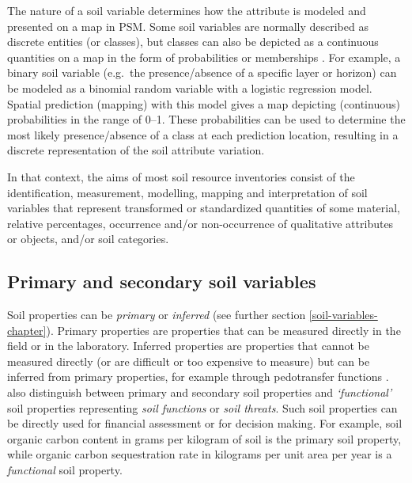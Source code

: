 \documentclass[graybox,natbib,nospthms,UStrade]{svmono}
\begin{document}
The nature of a soil variable determines how the attribute is modeled
and presented on a map in PSM. Some soil variables are
normally described as discrete entities (or classes), but classes can also be
depicted as a continuous quantities on a map in the form of
probabilities or memberships
\citep{DeGruijter1997Geoderma, McBratney2003Geoderma, Kempen2009Geoderma, Odgers201130}.
For example, a binary soil variable (e.g.~the presence/absence of a
specific layer or horizon) can be modeled as a binomial random variable
with a logistic regression model. Spatial prediction (mapping) with this
model gives a map depicting (continuous) probabilities in the range of
0--1. These probabilities can be used to determine the most likely presence/absence
of a class at each prediction location, resulting in a discrete
representation of the soil attribute variation.

In that context, the aims of most soil resource inventories consist of the
identification, measurement, modelling, mapping and interpretation of
soil variables that represent transformed or standardized quantities of
some material, relative percentages, occurrence and/or non-occurrence of
qualitative attributes or objects, and/or soil categories.

\hypertarget{primary-and-secondary-soil-variables}{%
\subsection{Primary and secondary soil variables}\label{primary-and-secondary-soil-variables}}

Soil properties can be \emph{primary} or \emph{inferred} (see further section \ref{soil-variables-chapter}).
Primary properties are properties that can be measured directly in the
field or in the laboratory. Inferred properties are properties that
cannot be measured directly (or are difficult or too expensive to
measure) but can be inferred from primary properties, for example through
pedotransfer functions \citep{Wosten2001JH, wosten2013soil}.
\citet{Dobos2006digital} also distinguish between primary and secondary soil
properties and \emph{`functional'} soil properties representing \emph{soil
functions} or \emph{soil threats}. Such soil properties can be directly used
for financial assessment or for decision making. For example, soil
organic carbon content in grams per kilogram of soil is the primary soil
property, while organic carbon sequestration rate in kilograms per unit
area per year is a \emph{functional} soil property.
\end{document}
